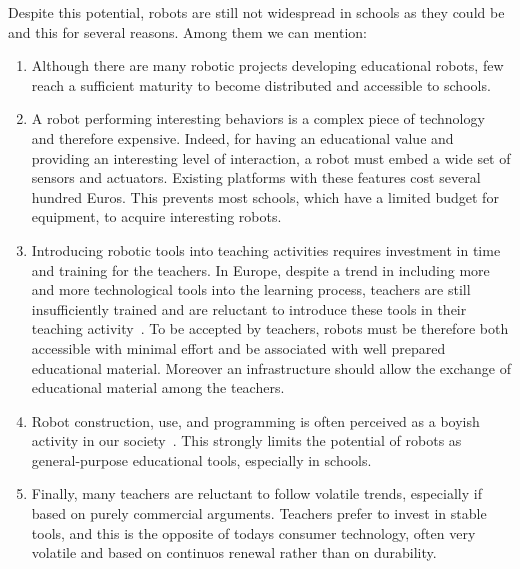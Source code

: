 \documentclass[letterpaper, 10 pt, conference]{ieeeconf}  %
\begin{document}
Despite this potential, robots are still not widespread in schools as they could be and this for several reasons. Among them we can mention:
\begin{enumerate}
\item Although there are many robotic projects developing educational robots, few reach a sufficient maturity to become distributed and accessible to schools. 
\item A robot performing interesting behaviors is a complex piece of technology and therefore expensive. 
Indeed, for having an educational value and providing an interesting level of interaction, a robot must embed a wide set of sensors and actuators.
Existing platforms with these features cost several hundred Euros.
This prevents most schools, which have a limited budget for equipment, to acquire interesting robots.
\item Introducing robotic tools into teaching activities requires investment in time and training for the teachers.
In Europe, despite a trend in including more and more technological tools into the learning process, teachers are still insufficiently trained and are reluctant to introduce these tools in their teaching activity~\cite{CERI2008}.
To be accepted by teachers, robots must be therefore both accessible with minimal effort and be associated with well prepared educational material. 
Moreover an infrastructure should allow the exchange of educational material among the teachers.
\item Robot construction, use, and programming is often perceived as a boyish activity in our society~\cite{leonard2009lego,nourbakhsh2009robot}.
This strongly limits the potential of robots as general-purpose educational tools, especially in schools.
\item Finally, many teachers are reluctant to follow volatile trends, especially if based on purely commercial arguments. Teachers prefer to invest in stable tools, and this is the opposite of todays consumer technology, often very volatile and based on continuos renewal rather than on durability.
\end{enumerate}
\end{document}
